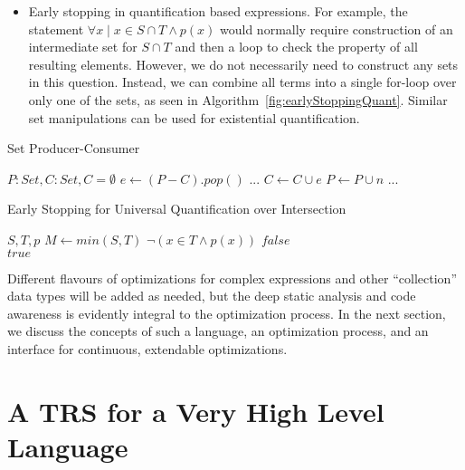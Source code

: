 \documentclass{article}
\begin{document}
\begin{itemize}
  \item Early stopping in quantification based expressions. For example, the statement $\forall x \mid x \in S \cap T \land p(x)$ would normally require construction of an intermediate set for $S \cap T$ and then a loop to check the property of all resulting elements. However, we do not necessarily need to construct any sets in this question. Instead, we can combine all terms into a single for-loop over only one of the sets, as seen in Algorithm~\ref{fig:earlyStoppingQuant}. Similar set manipulations can be used for existential quantification.
\end{itemize}

\begin{algorithm}[h]
  \caption{Set Producer-Consumer}
  \begin{algorithmic}
    \Require $P: Set, C: Set, C = \emptyset$
      \State $e \gets (P - C).pop()$
      ... 
      \State $C \gets C \cup {e}$
      \State $P \gets P \cup {n}$ ... 
    \EndWhile
  \end{algorithmic}
  \label{fig:prodcons}
\end{algorithm}

\begin{algorithm}[h]
  \caption{Early Stopping for Universal Quantification over Intersection}
  \begin{algorithmic}
    \Require $S, T, p$
    \State $M \gets min(S,T)$ 
      \If $\lnot(x \in T \land p(x))$
        \Return $false$
      \EndIf
    \EndFor\\
    \Return $true$
  \end{algorithmic}
  \label{fig:earlyStoppingQuant}
\end{algorithm}

Different flavours of optimizations for complex expressions and other ``collection'' data types will be added as needed, but the deep static analysis and code awareness is evidently integral to the optimization process. In the next section, we discuss the concepts of such a language, an optimization process, and an interface for continuous, extendable optimizations.

\section{A TRS for a Very High Level Language}
\end{document}
